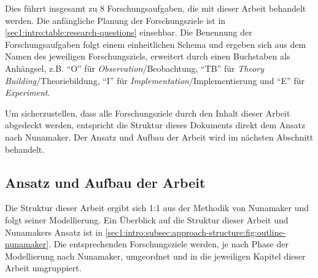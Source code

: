 Dies führrt insgesamt zu 8 Forschungsaufgaben, die mit dieser Arbeit behandelt werden.
Die anfängliche Planung der Forschungsziele ist in \cref{sec1:intro:table:research-questions} einsehbar.
Die Benennung der Forschungsaufgaben folgt einem einheitlichen Schema und ergeben sich aus dem Namen des jeweiligen Forschungsziels, erweitert durch einen Buchstaben als Anhängsel, z.B. \enquote{O}
 für \textit{Observation}/Beobachtung, \enquote{TB} für \textit{Theory Building}/Theoriebildung, \enquote{I} für \textit{Implementation}/Implementierung und \enquote{E} für \textit{Experiment}.

\noindent
Um sicherzustellen, dass alle Forschungsziele durch den Inhalt dieser Arbeit abgedeckt werden, entspricht die Struktur dieses Dokuments direkt dem Ansatz nach Nunamaker.
Der Ansatz und Aufbau der Arbeit wird im nächsten Abschnitt behandelt.

\subsection{Ansatz und Aufbau der Arbeit}
\label{sec1:intro:subsec:approach-structure}
Die Struktur dieser Arbeit ergibt sich 1:1 aus der Methodik von Nunamaker \cite{nunamaker} und folgt seiner Modellierung.
Ein Überblick auf die Struktur dieser Arbeit und Nunamakers Ansatz ist in \cref{sec1:intro:subsec:approach-structure:fig:outline-nunamaker}.
Die entsprechenden Forschungsziele werden, je nach Phase der Modellierung nach Nunamaker, umgeordnet und in die jeweiligen Kapitel dieser Arbeit umgruppiert.

